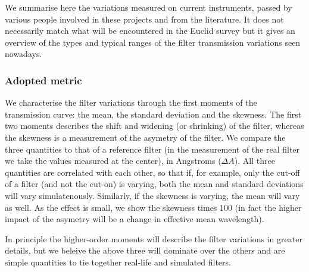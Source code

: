 \documentclass[11pt]{article}
\begin{document}
We summarise here the variations measured on current instruments, passed
by various people involved in these projects and from the literature. It
does not necessarily match what will be encountered in the Euclid survey
but it gives an overview of the types and typical ranges of the filter
transmission variations seen nowadays.

\subsubsection{Adopted metric}\label{adopted-metric}

We characterise the filter variations through the first moments of the
transmission curve: the mean, the standard deviation and the skewness.
The first two moments describes the shift and widening (or shrinking) of
the filter, whereas the skewness is a measurement of the asymetry of the
filter. We compare the three quantities to that of a reference filter
(in the measurement of the real filter we take the values measured at
the center), in Angstroms (\(\Delta A\)). All three quantities are
correlated with each other, so that if, for example, only the cut-off of
a filter (and not the cut-on) is varying, both the mean and standard
deviations will vary simulatenously. Similarly, if the skewness is
varying, the mean will vary as well. As the effect is small, we show the
skewness times 100 (in fact the higher impact of the asymetry will be a
change in effective mean wavelength).

In principle the higher-order moments will describe the filter
variations in greater details, but we beleive the above three will
dominate over the others and are simple quantities to tie together
real-life and simulated filters.
\end{document}

